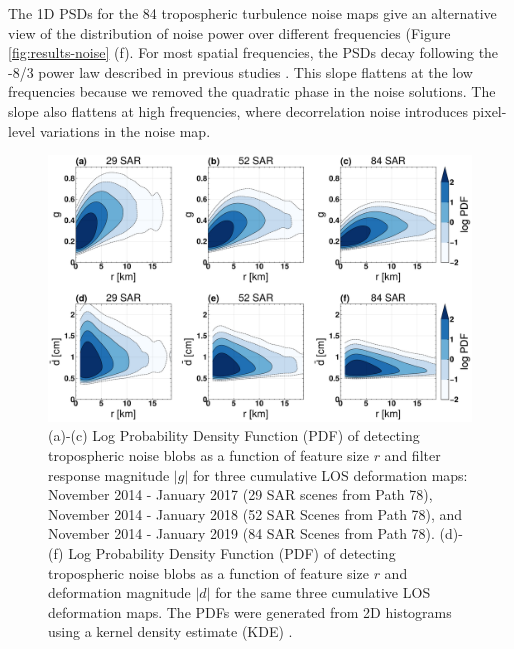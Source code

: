 The 1D PSDs for the 84 tropospheric turbulence noise maps give an alternative view of the distribution of noise power over different frequencies (Figure \ref{fig:results-noise} (f). For most spatial frequencies, the PSDs decay following the -8/3 power law described in previous studies \citep{Hanssen2001RadarInterferometryData, Onn2006ModelingWaterVapor}. This slope flattens at the low frequencies because we removed the quadratic phase in the noise solutions. The slope also flattens at high frequencies, where decorrelation noise introduces pixel-level variations in the noise map.



\begin{figure}
	\centering 
	\includegraphics[width=0.99\linewidth]{figures/chapter6-blobs/figure_results_kde.pdf}
	\caption[Probability density function of detecting tropospheric noise blobs]{
		(a)-(c) Log Probability Density Function (PDF) of detecting tropospheric noise blobs as a function of feature size $r$ and filter response magnitude $|g|$ for three cumulative LOS deformation maps: November 2014 - January 2017 (29 SAR scenes from Path 78), November 2014 - January 2018 (52 SAR Scenes from Path 78), and November 2014 - January 2019 (84 SAR Scenes from Path 78).
		(d)-(f) Log Probability Density Function (PDF) of detecting tropospheric noise blobs as a function of feature size $r$ and deformation magnitude $|d|$ for the same three cumulative LOS deformation maps.
		The PDFs were generated from 2D histograms using a kernel density estimate (KDE) \citep{Scott2015MultivariateDensityEstimation}.
	}
	\label{fig:results-kde}
\end{figure}


